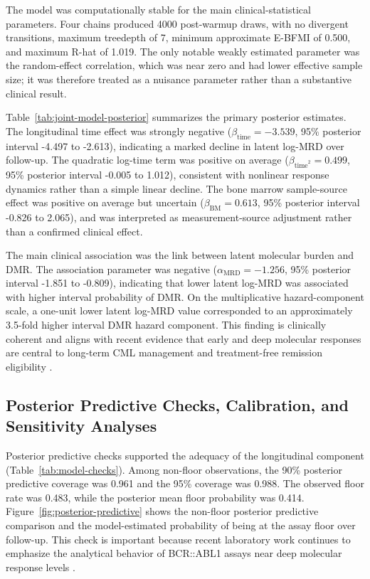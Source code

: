 The model was computationally stable for the main clinical-statistical parameters. Four chains produced 4000 post-warmup draws, with no divergent transitions, maximum treedepth of 7, minimum approximate E-BFMI of 0.500, and maximum R-hat of 1.019. The only notable weakly estimated parameter was the random-effect correlation, which was near zero and had lower effective sample size; it was therefore treated as a nuisance parameter rather than a substantive clinical result.

Table~\ref{tab:joint-model-posterior} summarizes the primary posterior estimates. The longitudinal time effect was strongly negative (\(\beta_{\mathrm{time}}=-3.539\), 95\% posterior interval -4.497 to -2.613), indicating a marked decline in latent log-MRD over follow-up. The quadratic log-time term was positive on average (\(\beta_{\mathrm{time}^2}=0.499\), 95\% posterior interval -0.005 to 1.012), consistent with nonlinear response dynamics rather than a simple linear decline. The bone marrow sample-source effect was positive on average but uncertain (\(\beta_{\mathrm{BM}}=0.613\), 95\% posterior interval -0.826 to 2.065), and was interpreted as measurement-source adjustment rather than a confirmed clinical effect.



The main clinical association was the link between latent molecular burden and DMR. The association parameter was negative (\(\alpha_{\mathrm{MRD}}=-1.256\), 95\% posterior interval -1.851 to -0.809), indicating that lower latent log-MRD was associated with higher interval probability of DMR. On the multiplicative hazard-component scale, a one-unit lower latent log-MRD value corresponded to an approximately 3.5-fold higher interval DMR hazard component. This finding is clinically coherent and aligns with recent evidence that early and deep molecular responses are central to long-term CML management and treatment-free remission eligibility \cite{Rasekh2026TFRPredictor,Ono2026MR45,Takahashi2026JSKI}.

\subsection{Posterior Predictive Checks, Calibration, and Sensitivity Analyses}

Posterior predictive checks supported the adequacy of the longitudinal component (Table~\ref{tab:model-checks}). Among non-floor observations, the 90\% posterior predictive coverage was 0.961 and the 95\% coverage was 0.988. The observed floor rate was 0.483, while the posterior mean floor probability was 0.414. Figure~\ref{fig:posterior-predictive} shows the non-floor posterior predictive comparison and the model-estimated probability of being at the assay floor over follow-up. This check is important because recent laboratory work continues to emphasize the analytical behavior of BCR::ABL1 assays near deep molecular response levels \cite{Kim2026BCRABLqPCR}.

